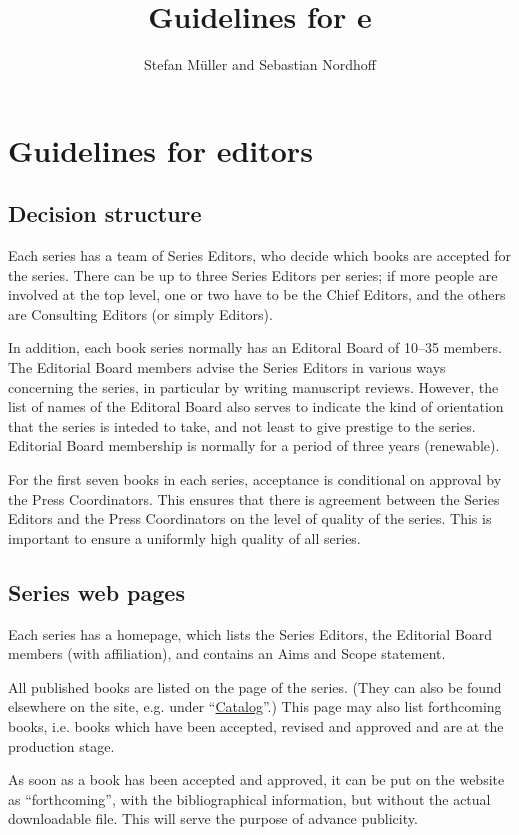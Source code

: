 \documentclass[ number=??
                ,series=lnls,
                ,isbn=000-0-000000-00-0,
                ,url=http://langsci-press.org/catalog/book/0,
	        ,output=long    %
	        ,draftmode  
		  ]{LSP/langsci}
\author{Stefan Müller and Sebastian Nordhoff}
\title{Guidelines for e}
\begin{document}
\chapter{Guidelines for editors}

\section{Decision structure}


Each \lsp series has a team of Series Editors, who decide which books are accepted for the
series. There can be up to three Series Editors per series; if more people are involved at the top
level, one or two have to be the Chief Editors, and the others are Consulting Editors (or simply
Editors).

In addition, each book series normally has an Editoral Board of 10--35 members. The Editorial Board
members advise the Series Editors in various ways concerning the series, in particular by writing
manuscript reviews. However, the list of names of the Editoral Board also serves to indicate the
kind of orientation that the series is inteded to take, and not least to give prestige to the
series. Editorial Board membership is normally for a period of three years (renewable).

For the first seven books in each series, acceptance is conditional on approval by the Press
Coordinators. This ensures that there is agreement between the Series Editors and the Press
Coordinators on the level of quality of the series. This is important to ensure a uniformly high
quality of all series.

\section{Series web pages}

Each series has a homepage, which lists the Series Editors, the Editorial Board members (with
affiliation), and contains an Aims and Scope statement.

All published books are listed on the page of the series. (They can also be found elsewhere on the
\lsp site, e.g. under ``\href{http://langsci-press.org/catalog}{Catalog}''.) This page may also list
forthcoming books, i.e. books which have been accepted, revised and approved and are at the
production stage.

As soon as a book has been accepted and approved, it can be put on the website as ``forthcoming'',
with the bibliographical information, but without the actual downloadable file. This will serve the
purpose of advance publicity.
\end{document}
